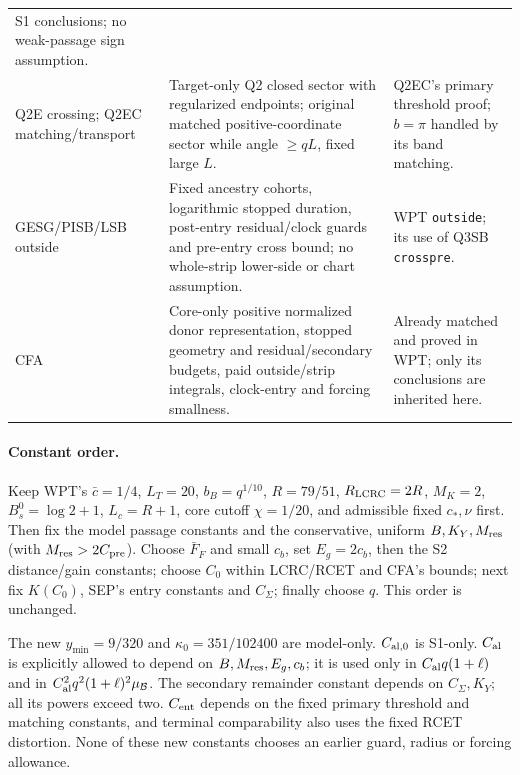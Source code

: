 \documentclass[11pt]{article}
\numberwithin{equation}{section}
\theoremstyle{remark}\newtheorem{remark}[theorem]{Remark}
\newcommand{\BB}{\mathcal B}
\begin{document}
\begin{longtable}{>{\raggedright\arraybackslash}p{}
 >{\raggedright\arraybackslash}p{}
 >{\raggedright\arraybackslash}p{}}
S1 conclusions; no weak-passage sign assumption.\\[4pt]
Q2E crossing; Q2EC matching/transport & Target-only Q2 closed sector
with regularized endpoints; original matched positive-coordinate
sector while angle $\ge qL$, fixed large $L$. & Q2EC's primary
threshold proof; $b=\pi$ handled by its band matching.\\[4pt]
GESG/PISB/LSB outside & Fixed ancestry cohorts, logarithmic stopped
duration, post-entry residual/clock guards and pre-entry cross
bound; no whole-strip lower-side or chart assumption. & WPT
\texttt{outside}; its use of Q3SB \texttt{crosspre}.\\[4pt]
CFA & Core-only positive normalized donor representation, stopped
geometry and residual/secondary budgets, paid outside/strip
integrals, clock-entry and forcing smallness. & Already matched
and proved in WPT; only its conclusions are inherited here.\\
\bottomrule
\end{longtable}

\paragraph{Constant order.}
Keep WPT's $\bar c=1/4$, $L_T=20$, $b_B=q^{1/10}$,
$R=79/51$, $R_{\rm LCRC}=2R$, $M_K=2$,
$B_s^0=\log2+1$, $L_c=R+1$, core cutoff $\chi=1/20$,
and admissible fixed $c_*,\nu$ first. Then fix the model passage
constants and the conservative, uniform $B,K_Y,M_{\rm res}$
(with $M_{\rm res}>2C_{\rm pre}$). Choose $\bar F_F$ and
small $c_b$, set $E_g=2c_b$, then the S2 distance/gain constants;
choose $C_0$ within LCRC/RCET and CFA's bounds; next fix
$K(C_0)$, SEP's entry constants and $C_\Sigma$; finally choose $q$.
This order is unchanged.

The new $y_{\min}=9/320$ and $\kappa_0=351/102400$ are model-only.
$C_{\rm al,0}$ is S1-only. $C_{\rm al}$ is explicitly allowed to
depend on $B,M_{\rm res},E_g,c_b$; it is used only in
$C_{\rm al}q(1+\ell)$ and in
$C_{\rm al}^2q^2(1+\ell)^2\mu_{\BB}$.
The secondary remainder constant depends on $C_\Sigma,K_Y$;
all its powers exceed two. $C_{\rm ent}$ depends on the fixed
primary threshold and matching constants, and terminal comparability
also uses the fixed RCET distortion. None of these new constants
chooses an earlier guard, radius or forcing allowance.
\end{document}
